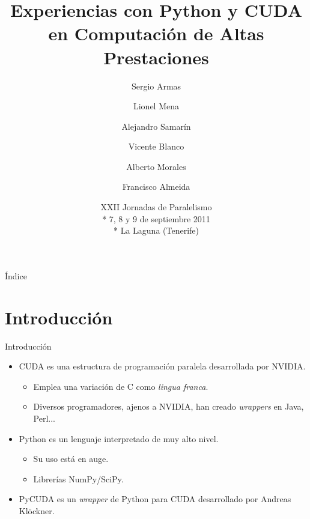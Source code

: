 \documentclass{beamer}
\title[Computación con Python y CUDA] %
{Experiencias con Python y CUDA en Computación de Altas Prestaciones}
\author[S. Armas, L. Mena, A. Samarín \emph{et ál}.] %
{Sergio Armas \and Lionel Mena \and Alejandro Samarín \and
 Vicente Blanco\inst{1} \and Alberto Morales \and Francisco Almeida}
\institute[Universidad de La Laguna] %
{
  \inst{1}%
  Departamento de Estadística, I.O. y Computación\\
  Universidad de La Laguna}
\date[JP 2011] %
{XXII Jornadas de Paralelismo\\*
 7, 8 y 9 de septiembre 2011\\*
 La Laguna (Tenerife)}
\begin{document}
\begin{frame}
  \titlepage
\end{frame}

\begin{frame}{Índice}
  \tableofcontents
\end{frame}





\section{Introducción}

\begin{frame}{Introducción}

  \begin{itemize}
  \item
    CUDA es una estructura de programación paralela desarrollada por NVIDIA.   
  \begin{itemize}
    \item Emplea una variación de C como \emph{lingua franca}.
    \item Diversos programadores, ajenos a NVIDIA, han creado \emph{wrappers} en Java, Perl...
  \end{itemize}
  \item
    Python es un lenguaje interpretado de muy alto nivel.
  \begin{itemize}
    \item Su uso está en auge.
    \item Librerías NumPy/SciPy.
  \end{itemize}
  \item
    PyCUDA es un \emph{wrapper} de Python para CUDA desarrollado por Andreas Klöckner.
  \end{itemize}
\end{frame}
\end{document}
